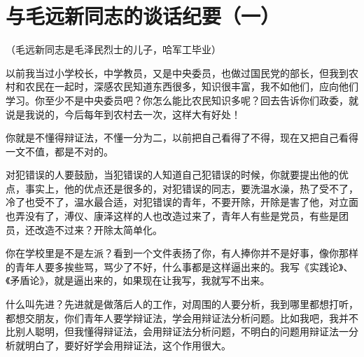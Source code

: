 \section[与毛远新同志的谈话纪要（一）（一九六四年二月）]{与毛远新同志的谈话纪要（一）}


（毛远新同志是毛泽民烈士的儿子，哈军工毕业）

以前我当过小学校长，中学教员，又是中央委员，也做过国民党的部长，但我到农村和农民在一起时，深感农民知道东西很多，知识很丰富，我不如他们，应向他们学习。你至少不是中央委员吧？你怎么能比农民知识多呢？回去告诉你们政委，就说是我说的，今后每年到农村去一次，这样大有好处！

你就是不懂得辩证法，不懂一分为二，以前把自己看得了不得，现在又把自己看得一文不值，都是不对的。

对犯错误的人要鼓励，当犯错误的人知道自己犯错误的时候，你就要提出他的优点，事实上，他的优点还是很多的，对犯错误的同志，要洗温水澡，热了受不了，冷了也受不了，温水最合适，对犯错误的青年，不要开除，开除是害了他，对立面也弄没有了，溥仪、康泽这样的人也改造过来了，青年人有些是党员，有些是团员，还改造不过来？开除太简单化。

你在学校里是不是左派？看到一个文件表扬了你，有人捧你并不是好事，像你那样的青年人要多挨些骂，骂少了不好，什么事都是这样逼出来的。我写《实践论》、《矛盾论》，就是逼出来的，如果现在让我写，我就写不出来。

什么叫先进？先进就是做落后人的工作，对周围的人要分析，我到哪里都想打听，都想交朋友，你们青年人要学辩证法，学会用辩证法分析问题。比如我吧，我并不比别人聪明，但我懂得辩证法，会用辩证法分析问题，不明白的问题用辩证法一分析就明白了，要好好学会用辩证法，这个作用很大。


